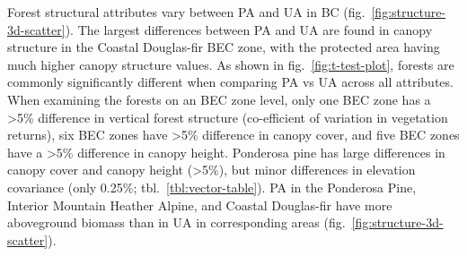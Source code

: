 \documentclass[10pt,oneside]{article}
\begin{document}
Forest structural attributes vary between PA and UA in BC
(fig.~\ref{fig:structure-3d-scatter}). The largest differences between
PA and UA are found in canopy structure in the Coastal Douglas-fir BEC
zone, with the protected area having much higher canopy structure
values. As shown in fig.~\ref{fig:t-test-plot}, forests are commonly
significantly different when comparing PA vs UA across all attributes.
When examining the forests on an BEC zone level, only one BEC zone has a
\textgreater5\% difference in vertical forest structure (co-efficient of
variation in vegetation returns), six BEC zones have \textgreater5\%
difference in canopy cover, and five BEC zones have a \textgreater5\%
difference in canopy height. Ponderosa pine has large differences in
canopy cover and canopy height (\textgreater5\%), but minor differences
in elevation covariance (only 0.25\%; tbl.~\ref{tbl:vector-table}). PA
in the Ponderosa Pine, Interior Mountain Heather Alpine, and Coastal
Douglas-fir have more aboveground biomass than in UA in corresponding
areas (fig.~\ref{fig:structure-3d-scatter}).
\end{document}
